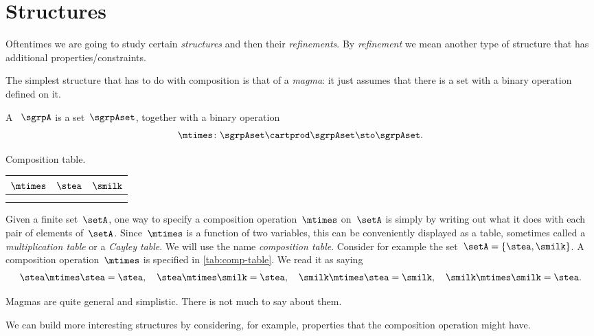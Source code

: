 
\section{Structures}
\label{sec:structures}

Oftentimes we are going to study certain \emph{structures} and then their \emph{refinements}.
By \emph{refinement} we mean another type of structure that has additional properties/constraints.

The simplest structure that has to do with composition is that of a \emph{magma}: it just assumes that there is a set with a binary operation defined on it.

\begin{ctdefinition}[Magma]
	\label{def:magma}
	A \emph{}~$\sgrpA$ is a set~$\sgrpAset$, together with a binary operation
	\begin{equation}
		\mtimes  \colon \sgrpAset \cartprod \sgrpAset \sto \sgrpAset.
	\end{equation}
\end{ctdefinition}

\begin{margintable}
	\centering
	\caption{Composition table.}
	\label{tab:comp-table}
	\begin{tabular}{c|cc}
		$\mtimes$ & $\stea$ & $\smilk$ \\
		\hline
		\stea     & \stea   & \stea    \\
		\smilk    & \smilk  & \stea
	\end{tabular}
\end{margintable}

Given a finite set~$\setA$, one way to specify a composition operation~$\mtimes$ on~$\setA$ is simply by writing out what it does with each pair of elements of~$\setA$.
Since~$\mtimes$ is a function of two variables, this can be conveniently displayed as a table, sometimes called a \emph{multiplication table} or a \emph{Cayley table}.
We will use the name \emph{composition table}.
Consider for example the set~$\setA = \{ \stea, \smilk\}$.
A composition operation~$\mtimes$ is specified in \cref{tab:comp-table}.
We read it as saying
\begin{equation*}
	\stea \mtimes \stea = \stea, \quad \stea \mtimes \smilk = \stea, \quad \smilk \mtimes \stea = \smilk,  \quad \smilk \mtimes \smilk = \stea.
\end{equation*}

Magmas are quite general and simplistic.
There is not much to say about them.

We can build more interesting structures by considering, for example, properties that the composition operation might have.
